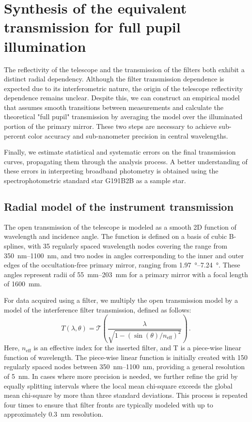 \section{Synthesis of the equivalent transmission for full pupil illumination}
\label{sec:pupil_stitching}

The reflectivity of the telescope and the transmission of the filters
both exhibit a distinct radial dependency. Although the filter
transmission dependence is expected due to its interferometric nature,
the origin of the telescope reflectivity dependence remains
unclear. Despite this, we can construct an empirical model that
assumes smooth transitions between measurements and calculate the
theoretical "full pupil" transmission by averaging the model over the
illuminated portion of the primary mirror. These two steps are
necessary to achieve sub-percent color accuracy and sub-nanometer
precision in central wavelengths.

Finally, we estimate statistical and systematic errors on the final
transmission curves, propagating them through the analysis process. A
better understanding of these errors in interpreting broadband
photometry is obtained using the spectrophotometric standard star
G191B2B as a sample star.


\subsection{Radial model of the instrument transmission}
\label{sec:model}

The open transmission of the telescope is modeled as a smooth 2D
function of wavelength and incidence angle. The function is defined on
a basis of cubic B-splines, with \num{35} regularly spaced wavelength
nodes covering the range from \SIrange{350}{1100}{nm}, and two nodes
in angles corresponding to the inner and outer edges of the
occultation-free primary mirror, ranging from \SIrange{1.97}{7.24}
{\degree}. These angles represent radii of \SIrange{55}{203}{mm} for a
primary mirror with a focal length of \SI{1600}{mm}.

For data acquired using a filter, we multiply the open transmission
model by a model of the interference filter transmission, defined as
follows:
\begin{equation}
  \label{eq:filtertransmission}
T(\lambda, \theta) = \mathcal T\left(\frac{\lambda}{\sqrt{1 -
    (\sin(\theta) / n_\text{eff})^2}}\right)\,.
\end{equation}
Here, $n_\text{eff}$ is an effective index for the inserted filter,
and T is a piece-wise linear function of wavelength. The piece-wise
linear function is initially created with \num{150} regularly spaced
nodes between \SIrange{350}{1100}{nm}, providing a general resolution
of \SI{5}{nm}. In cases where more precision is needed, we further
refine the grid by equally splitting intervals where the local mean
chi-square exceeds the global mean chi-square by more than three
standard deviations. This process is repeated four times to ensure
that filter fronts are typically modeled with up to approximately
\SI{0.3}{nm} resolution.


